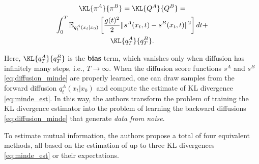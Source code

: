 \vspace{-5mm}
\begin{gather}
    \KL{\pi^A}{\pi^B}=\KL{Q^A}{Q^B}=
    \nonumber
    \\
    \int_0^T \mathbb{E}_{q^A_t(x_t|x_0)} \left[ 
    \frac{g(t)^2}{2}
    \| s^{A}(x_t, t) - s^{B}(x_t, t) \|^2\right]dt +
    \nonumber
    \\
    \KL{q^A_{T}}{q^B_{T}} \label{eq:minde_est}.
\end{gather}
\vspace{-4mm}

Here, $\KL{q^A_{T}}{q^B_{T}}$ is the \textbf{bias} term, which vanishes only when diffusion has infinitely many steps, i.e., $T \rightarrow \infty$.  When the diffusion score functions $s^A$ and $s^B$ \eqref{eq:diffusion_minde} are properly learned, one can draw samples from the forward diffusion $q^A_t(x_t|x_0)$ and compute the estimate of KL divergence \eqref{eq:minde_est}. In this way, the authors transform the problem of training the KL divergence estimator into the problem of learning the backward diffusions \eqref{eq:diffusion_minde} that generate \textit{data from noise}.

To estimate mutual information, the authors propose a total of four equivalent methods, all based on the estimation of up to three KL divergences \eqref{eq:minde_est} or their expectations.

\vspace{-3mm}